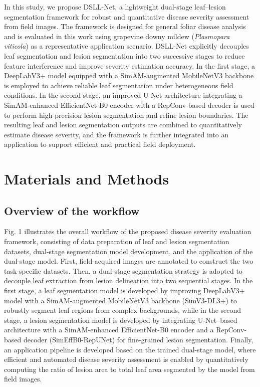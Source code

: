 \documentclass[
]{article}
\begin{document}
In this study, we propose DSLL-Net, a lightweight dual-stage
leaf--lesion segmentation framework for robust and quantitative disease
severity assessment from field images. The framework is designed for
general foliar disease analysis and is evaluated in this work using
grapevine downy mildew (\emph{Plasmopara viticola}) as a representative
application scenario. DSLL-Net explicitly decouples leaf segmentation
and lesion segmentation into two successive stages to reduce feature
interference and improve severity estimation accuracy. In the first
stage, a DeepLabV3+ model equipped with a SimAM-augmented MobileNetV3
backbone is employed to achieve reliable leaf segmentation under
heterogeneous field conditions. In the second stage, an improved U-Net
architecture integrating a SimAM-enhanced EfficientNet-B0 encoder with a
RepConv-based decoder is used to perform high-precision lesion
segmentation and refine lesion boundaries. The resulting leaf and lesion
segmentation outputs are combined to quantitatively estimate disease
severity, and the framework is further integrated into an application to
support efficient and practical field deployment.

\hypertarget{materials-and-methods}{%
\section{Materials and Methods}\label{materials-and-methods}}

\hypertarget{overview-of-the-workflow}{%
\subsection{Overview of the workflow}\label{overview-of-the-workflow}}

Fig. 1 illustrates the overall workflow of the proposed disease severity
evaluation framework, consisting of data preparation of leaf and lesion
segmentation datasets, dual-stage segmentation model development, and
the application of the dual-stage model. First, field-acquired images
are annotated to construct the two task-specific datasets. Then, a
dual-stage segmentation strategy is adopted to decouple leaf extraction
from lesion delineation into two sequential stages. In the first stage,
a leaf segmentation model is developed by improving DeepLabV3+ model
with a SimAM-augmented MobileNetV3 backbone (SimV3-DL3+) to robustly
segment leaf regions from complex backgrounds, while in the second
stage, a lesion segmentation model is developed by integrating
U-Net--based architecture with a SimAM-enhanced EfficientNet-B0 encoder
and a RepConv-based decoder (SimEffB0-RepUNet) for fine-grained lesion
segmentation. Finally, an application pipeline is developed based on the
trained dual-stage model, where efficient and automated disease severity
assessment is enabled by quantitatively computing the ratio of lesion
area to total leaf area segmented by the model from field images.
\end{document}
